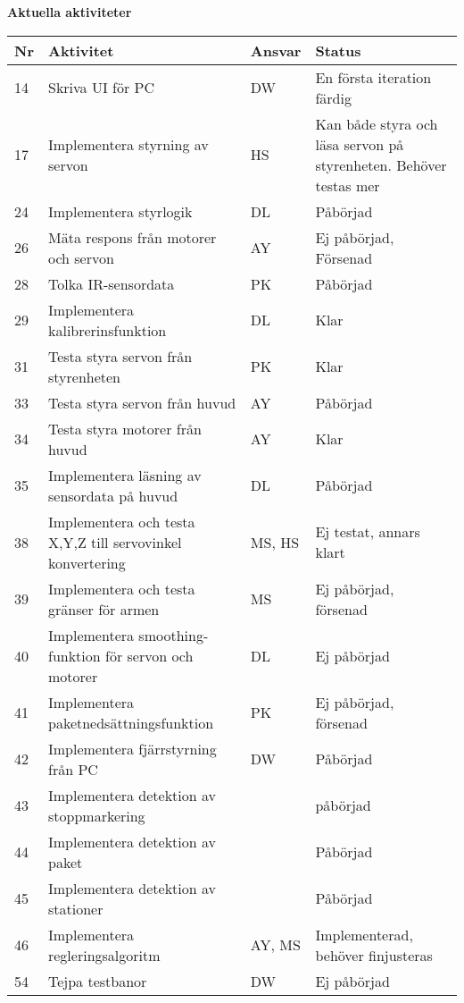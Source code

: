 \documentclass[titlepage, a4paper]{article}
\begin{document}
\newpage
\textbf{\Large Aktuella aktiviteter}
\begin{center}
\begin{tabularx}{\textwidth}{| p{4mm} | X | p{13.5mm} | X |}
	\hline
	\textbf{Nr} & \textbf{Aktivitet} & \textbf{Ansvar} & \textbf{Status} \\\hline	
	{14} & {Skriva UI för PC} & {DW} & {En första iteration färdig} \\\hline
	{17} & {Implementera styrning av servon} & {HS} & {Kan både styra och läsa servon på styrenheten. Behöver testas mer} \\\hline
	{24} & {Implementera styrlogik} & {DL} & {Påbörjad} \\\hline
	{26} & {Mäta respons från motorer och servon} & {AY} & {Ej påbörjad, Försenad} \\\hline
	{28} & {Tolka IR-sensordata} & {PK} & {Påbörjad} \\\hline
	{29} & {Implementera kalibrerinsfunktion} & {DL} & {Klar} \\\hline
	{31} & {Testa styra servon från styrenheten} & {PK} & {Klar} \\\hline
	{33} & {Testa styra servon från huvud} & {AY} & {Påbörjad} \\\hline
	{34} & {Testa styra motorer från huvud} & {AY} & {Klar} \\\hline
	{35} & {Implementera läsning av sensordata på huvud} & {DL} & {Påbörjad} \\\hline
	{38} & {Implementera och testa X,Y,Z  till servovinkel konvertering} & {MS, HS} & {Ej testat, annars klart} \\\hline
	{39} & {Implementera och testa gränser för armen} & {MS} & {Ej påbörjad, försenad} \\\hline
	{40} & {Implementera smoothing-funktion för servon och motorer} & {DL} & {Ej påbörjad} \\\hline
	{41} & {Implementera paketnedsättningsfunktion} & {PK} & {Ej påbörjad, försenad} \\\hline
	{42} & {Implementera fjärrstyrning från PC} & {DW} & {Påbörjad} \\\hline
	{43} & {Implementera detektion av stoppmarkering} & {} & {påbörjad} \\\hline
	{44} & {Implementera detektion av paket} & {} & {Påbörjad} \\\hline
	{45} & {Implementera detektion av stationer} & {} & {Påbörjad} \\\hline
	{46} & {Implementera regleringsalgoritm} & {AY, MS} & {Implementerad, behöver finjusteras} \\\hline
	{54} & {Tejpa testbanor} & {DW} & {Ej påbörjad} \\\hline
	
\end{tabularx}
\end{center}
\end{document}
